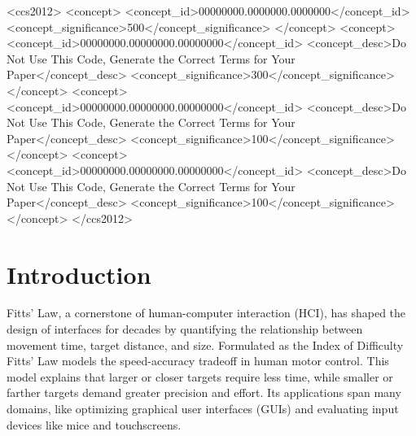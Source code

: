 \documentclass[acmlarge]{acmart}
\begin{document}
\begin{CCSXML}
<ccs2012>
 <concept>
  <concept_id>00000000.0000000.0000000</concept_id>
  <concept_significance>500</concept_significance>
 </concept>
 <concept>
  <concept_id>00000000.00000000.00000000</concept_id>
  <concept_desc>Do Not Use This Code, Generate the Correct Terms for Your Paper</concept_desc>
  <concept_significance>300</concept_significance>
 </concept>
 <concept>
  <concept_id>00000000.00000000.00000000</concept_id>
  <concept_desc>Do Not Use This Code, Generate the Correct Terms for Your Paper</concept_desc>
  <concept_significance>100</concept_significance>
 </concept>
 <concept>
  <concept_id>00000000.00000000.00000000</concept_id>
  <concept_desc>Do Not Use This Code, Generate the Correct Terms for Your Paper</concept_desc>
  <concept_significance>100</concept_significance>
 </concept>
</ccs2012>
\end{CCSXML}







\maketitle

\section{Introduction}
Fitts’ Law, a cornerstone of human-computer interaction (HCI), has shaped the design of interfaces for decades by quantifying the relationship between movement time, target distance, and size. Formulated as the Index of Difficulty 
Fitts’ Law models the speed-accuracy tradeoff in human motor control. This model explains that larger or closer targets require less time, while smaller or farther targets demand greater precision and effort. Its applications span many domains, like optimizing graphical user interfaces (GUIs) and evaluating input devices like mice and touchscreens.
\end{document}
